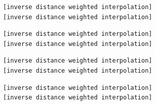 \documentclass[
  letterpaper,
  oneside,
  open=any]{scrbook}
\begin{document}
\begin{verbatim}
[inverse distance weighted interpolation]
[inverse distance weighted interpolation]
\end{verbatim}

\begin{verbatim}
[inverse distance weighted interpolation]
[inverse distance weighted interpolation]
\end{verbatim}

\begin{verbatim}
[inverse distance weighted interpolation]
[inverse distance weighted interpolation]
\end{verbatim}

\begin{verbatim}
[inverse distance weighted interpolation]
[inverse distance weighted interpolation]
\end{verbatim}
\end{document}
